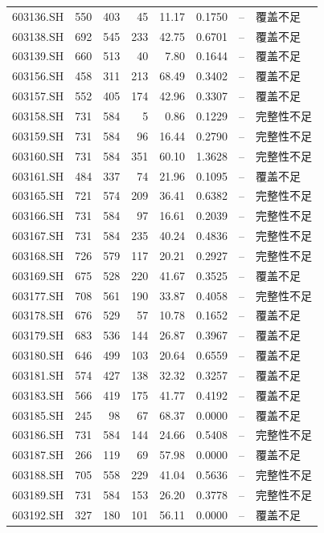 \documentclass[10pt,a4paper]{article}
\begin{document}
\begin{longtable}{lrrr r r r l}
603136.SH & 550 & 403 & 45 & 11.17 & 0.1750 & -- & 覆盖不足\\
603138.SH & 692 & 545 & 233 & 42.75 & 0.6701 & -- & 覆盖不足\\
603139.SH & 660 & 513 & 40 & 7.80 & 0.1644 & -- & 覆盖不足\\
603156.SH & 458 & 311 & 213 & 68.49 & 0.3402 & -- & 覆盖不足\\
603157.SH & 552 & 405 & 174 & 42.96 & 0.3307 & -- & 覆盖不足\\
603158.SH & 731 & 584 & 5 & 0.86 & 0.1229 & -- & 完整性不足\\
603159.SH & 731 & 584 & 96 & 16.44 & 0.2790 & -- & 完整性不足\\
603160.SH & 731 & 584 & 351 & 60.10 & 1.3628 & -- & 完整性不足\\
603161.SH & 484 & 337 & 74 & 21.96 & 0.1095 & -- & 覆盖不足\\
603165.SH & 721 & 574 & 209 & 36.41 & 0.6382 & -- & 完整性不足\\
603166.SH & 731 & 584 & 97 & 16.61 & 0.2039 & -- & 完整性不足\\
603167.SH & 731 & 584 & 235 & 40.24 & 0.4836 & -- & 完整性不足\\
603168.SH & 726 & 579 & 117 & 20.21 & 0.2927 & -- & 完整性不足\\
603169.SH & 675 & 528 & 220 & 41.67 & 0.3525 & -- & 覆盖不足\\
603177.SH & 708 & 561 & 190 & 33.87 & 0.4058 & -- & 完整性不足\\
603178.SH & 676 & 529 & 57 & 10.78 & 0.1652 & -- & 覆盖不足\\
603179.SH & 683 & 536 & 144 & 26.87 & 0.3967 & -- & 覆盖不足\\
603180.SH & 646 & 499 & 103 & 20.64 & 0.6559 & -- & 覆盖不足\\
603181.SH & 574 & 427 & 138 & 32.32 & 0.3257 & -- & 覆盖不足\\
603183.SH & 566 & 419 & 175 & 41.77 & 0.4192 & -- & 覆盖不足\\
603185.SH & 245 & 98 & 67 & 68.37 & 0.0000 & -- & 覆盖不足\\
603186.SH & 731 & 584 & 144 & 24.66 & 0.5408 & -- & 完整性不足\\
603187.SH & 266 & 119 & 69 & 57.98 & 0.0000 & -- & 覆盖不足\\
603188.SH & 705 & 558 & 229 & 41.04 & 0.5636 & -- & 完整性不足\\
603189.SH & 731 & 584 & 153 & 26.20 & 0.3778 & -- & 完整性不足\\
603192.SH & 327 & 180 & 101 & 56.11 & 0.0000 & -- & 覆盖不足\\

\end{longtable}
\end{document}

